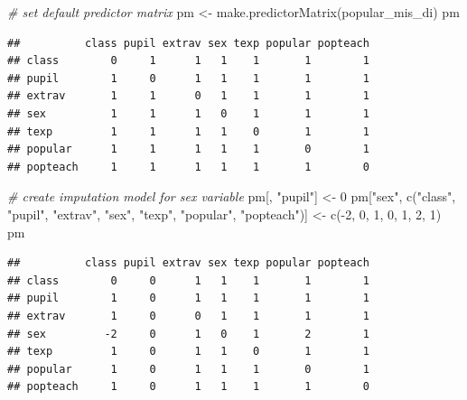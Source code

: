 \documentclass[
]{book}
\newenvironment{Shaded}{\begin{snugshade}}{\end{snugshade}}
\newcommand{\CommentTok}[1]{\textcolor[rgb]{0.56,0.35,0.01}{\textit{#1}}}
\newcommand{\DecValTok}[1]{\textcolor[rgb]{0.00,0.00,0.81}{#1}}
\newcommand{\FunctionTok}[1]{\textcolor[rgb]{0.00,0.00,0.00}{#1}}
\newcommand{\NormalTok}[1]{#1}
\newcommand{\OtherTok}[1]{\textcolor[rgb]{0.56,0.35,0.01}{#1}}
\newcommand{\SpecialCharTok}[1]{\textcolor[rgb]{0.00,0.00,0.00}{#1}}
\newcommand{\StringTok}[1]{\textcolor[rgb]{0.31,0.60,0.02}{#1}}
\begin{document}
\begin{Shaded}
\begin{Highlighting}[]
\CommentTok{\# set default predictor matrix}
\NormalTok{pm }\OtherTok{\textless{}{-}} \FunctionTok{make.predictorMatrix}\NormalTok{(popular\_mis\_di)}
\NormalTok{pm}
\end{Highlighting}
\end{Shaded}

\begin{verbatim}
##          class pupil extrav sex texp popular popteach
## class        0     1      1   1    1       1        1
## pupil        1     0      1   1    1       1        1
## extrav       1     1      0   1    1       1        1
## sex          1     1      1   0    1       1        1
## texp         1     1      1   1    0       1        1
## popular      1     1      1   1    1       0        1
## popteach     1     1      1   1    1       1        0
\end{verbatim}

\begin{Shaded}
\begin{Highlighting}[]
\CommentTok{\# create imputation model for sex variable}
\NormalTok{pm[, }\StringTok{"pupil"}\NormalTok{] }\OtherTok{\textless{}{-}} \DecValTok{0}
\NormalTok{pm[}\StringTok{"sex"}\NormalTok{, }\FunctionTok{c}\NormalTok{(}\StringTok{"class"}\NormalTok{, }\StringTok{"pupil"}\NormalTok{, }\StringTok{"extrav"}\NormalTok{, }\StringTok{"sex"}\NormalTok{, }\StringTok{"texp"}\NormalTok{, }\StringTok{"popular"}\NormalTok{, }\StringTok{"popteach"}\NormalTok{)] }\OtherTok{\textless{}{-}} \FunctionTok{c}\NormalTok{(}\SpecialCharTok{{-}}\DecValTok{2}\NormalTok{, }\DecValTok{0}\NormalTok{, }\DecValTok{1}\NormalTok{, }\DecValTok{0}\NormalTok{, }\DecValTok{1}\NormalTok{, }\DecValTok{2}\NormalTok{, }\DecValTok{1}\NormalTok{)}
\NormalTok{pm}
\end{Highlighting}
\end{Shaded}

\begin{verbatim}
##          class pupil extrav sex texp popular popteach
## class        0     0      1   1    1       1        1
## pupil        1     0      1   1    1       1        1
## extrav       1     0      0   1    1       1        1
## sex         -2     0      1   0    1       2        1
## texp         1     0      1   1    0       1        1
## popular      1     0      1   1    1       0        1
## popteach     1     0      1   1    1       1        0
\end{verbatim}
\end{document}
